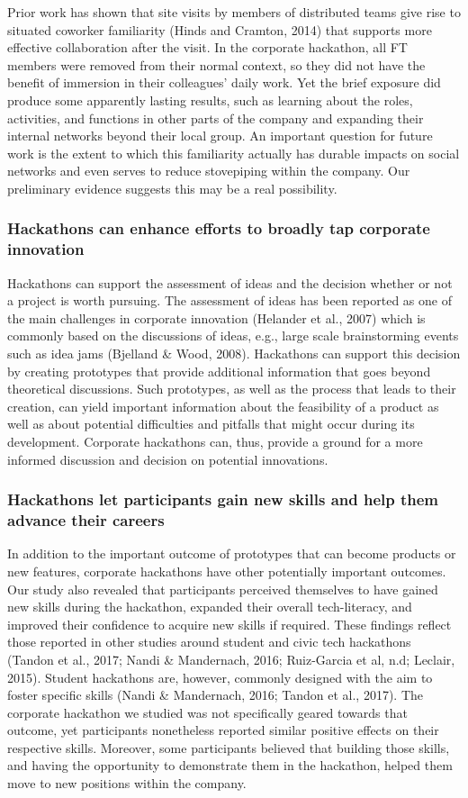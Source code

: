 \documentclass{hcij}
\begin{document}
Prior work has shown that site visits by members of distributed teams give rise to situated coworker familiarity (Hinds and Cramton, 2014) that supports more effective collaboration after the visit. In the corporate hackathon, all FT members were removed from their normal context, so they did not have the benefit of immersion in their colleagues’ daily work. Yet the brief exposure did produce some apparently lasting results, such as learning about the roles, activities, and functions in other parts of the company and expanding their internal networks beyond their local group. An important question for future work is the extent to which this familiarity actually has durable impacts on social networks and even serves to reduce stovepiping within the company. Our preliminary evidence suggests this may be a real possibility.

\subsubsection{Hackathons can enhance efforts to broadly tap corporate innovation}
Hackathons can support the assessment of ideas and the decision whether or not a project is worth pursuing. The assessment of ideas has been reported as one of the main challenges in corporate innovation (Helander et al., 2007) which is commonly based on the discussions of ideas, e.g., large scale brainstorming events such as idea jams (Bjelland & Wood, 2008). Hackathons can support this decision by creating prototypes that provide additional information that goes beyond theoretical discussions. Such prototypes, as well as the process that leads to their creation, can yield important information about the feasibility of a product as well as about potential difficulties and pitfalls that might occur during its development. Corporate hackathons can, thus, provide a ground for a more informed discussion and decision on potential innovations.

\subsubsection{Hackathons let participants gain new skills and help them advance their careers}
In addition to the important outcome of prototypes that can become products or new features, corporate hackathons have other potentially important outcomes. Our study also revealed that participants perceived themselves to have gained new skills during the hackathon, expanded their overall tech-literacy, and improved their confidence to acquire new skills if required. These findings reflect those reported in other studies around student and civic tech hackathons (Tandon et al., 2017; Nandi & Mandernach, 2016; Ruiz-Garcia et al, n.d; Leclair, 2015). Student hackathons are, however, commonly designed with the aim to foster specific skills (Nandi & Mandernach, 2016; Tandon et al., 2017). The corporate hackathon we studied was not specifically geared towards that outcome, yet participants nonetheless reported similar positive effects on their respective skills. Moreover, some participants believed that building those skills, and having the opportunity to demonstrate them in the hackathon, helped them move to new positions within the company.
\end{document}
